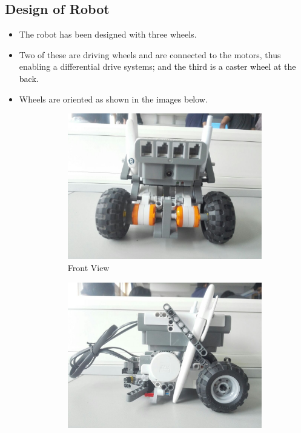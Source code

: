 \documentclass[10pt,a4paper]{article}
\begin{document}
			\subsection{Design of Robot}
				\begin{itemize}
					\item The robot has been designed with three wheels.
					\item Two of these are driving wheels and are connected to the motors, thus enabling a differential drive systems; and \textcolor{black}{the third is a caster wheel at the back}.
					\item Wheels are oriented as shown in the \textcolor{black}{images below}.
					\begin{figure}[H]
						\begin{subfigure}{0.5\textwidth}
							\centering
							\includegraphics[width=0.8\linewidth]{img/front.jpeg}
							\caption{Front View}
							\label{fig:fview}
						\end{subfigure}%
						\begin{subfigure}{0.5\textwidth}
							\centering
							\includegraphics[width=0.8\linewidth]{img/right.jpeg}

\end{subfigure}
\end{figure}
\end{itemize}
\end{document}

